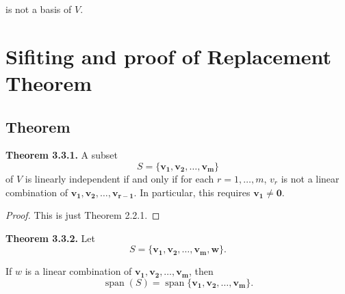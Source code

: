 \documentclass[12pt]{article}
\begin{document}
is not a basis of $V$.

\newpage

\section{Sifiting and proof of Replacement Theorem}

\subsection{Theorem}

\textbf{Theorem 3.3.1.}
A subset
\[
S=\{\mathbf{v_1,v_2,\ldots,v_m}\}
\]
of $V$ is linearly independent if and only if for each
$r=1,\ldots,m$,
$v_r$ is not a linear combination of
$\mathbf{v_1,v_2,\ldots,v_{r-1}}$.
In particular, this requires
$\mathbf{v_1}\neq\mathbf{0}$.

\begin{proof}
This is just Theorem 2.2.1.
\end{proof}

\textbf{Theorem 3.3.2.}
Let
\[
S=\{\mathbf{v_1,v_2,\ldots,v_m,w}\}.
\]

If $w$ is a linear combination of
$\mathbf{v_1,v_2,\ldots,v_m}$, then
\[
\operatorname{span}(S)=\operatorname{span}\{\mathbf{v_1,v_2,\ldots,v_m}\}.
\]
\end{document}

